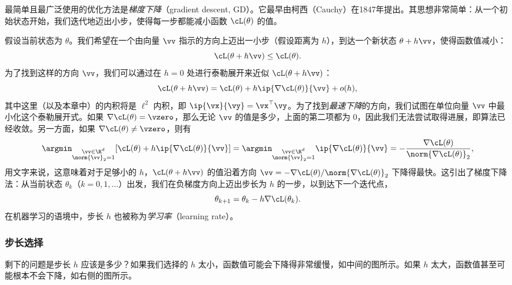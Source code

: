 \documentclass[../../book-main_zh.tex]{subfiles}
\begin{document}
最简单且最广泛使用的优化方法是\textit{梯度下降}（gradient descent, GD）。它最早由柯西（Cauchy）在1847年提出。其思想非常简单：从一个初始状态开始，我们迭代地迈出小步，使得每一步都能减小函数 \(\cL(\theta)\) 的值。

假设当前状态为 \(\theta\)。我们希望在一个由向量 \(\vv\) 指示的方向上迈出一小步（假设距离为 \(h\)），到达一个新状态 \(\theta + h\vv\)，使得函数值减小：
\begin{equation}
    \cL(\theta + h\vv) \leq \cL(\theta).
\end{equation}
为了找到这样的方向 $\vv$，我们可以通过在 \(h = 0\) 处进行泰勒展开来近似 $\cL(\theta +
h\vv)$：
\begin{equation}
    \cL(\theta + h\vv) = \cL(\theta) + h\ip{\nabla \cL(\theta)}{\vv} + o(h),
\end{equation}
其中这里（以及本章中）的内积将是 \(\ell^{2}\) 内积，即 \(\ip{\vx}{\vy} = \vx^{\top}\vy\)。为了找到\textit{最速下降}的方向，我们试图在单位向量 \(\vv\) 中最小化这个泰勒展开式。如果 \(\nabla \cL(\theta) = \vzero\)，那么无论 \(\vv\) 的值是多少，上面的第二项都为 \(0\)，因此我们无法尝试取得进展，即算法已经收敛。另一方面，如果 \(\nabla \cL(\theta) \neq \vzero\)，则有
\begin{equation}\label{eq:steepest_descent_l2_norm}
    \argmin_{\substack{\vv \in \R^{d} \\ \norm{\vv}_{2} = 1}}
    [\cL(\theta) + h\ip{\nabla \cL(\theta)}{\vv}] =
    \argmin_{\substack{\vv \in \R^{d} \\ \norm{\vv}_{2} = 1}}
    \ip{\nabla \cL(\theta)}{\vv} = -\frac{\nabla
    \cL(\theta)}{\norm{\nabla \cL(\theta)}_{2}},
\end{equation}
用文字来说，这意味着对于足够小的 \(h\)，\(\cL(\theta + h\vv)\) 的值沿着方向 \(\vv = -\nabla \cL(\theta)
/ \norm{\nabla \cL(\theta)}_{2}\) 下降得最快。这引出了梯度下降法：从当前状态 \(\theta_{k}\)（\(k=0, 1, \ldots\)）出发，我们在负梯度方向上迈出步长为 \(h\) 的一步，以到达下一个迭代点，
\begin{equation}
    \theta_{k+1} = \theta_{k} - h \nabla \cL(\theta_{k}).
\end{equation}
在机器学习的语境中，步长 \(h\) 也被称为\textit{学习率}（learning rate）。

\subsubsection{步长选择}

剩下的问题是步长 \(h\) 应该是多少？如果我们选择的 \(h\) 太小，函数值可能会下降得非常缓慢，如中间的图所示。如果 \(h\) 太大，函数值甚至可能根本不会下降，如右侧的图所示。
\end{document}
